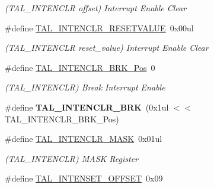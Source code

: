 \begin{DoxyCompactItemize}
\begin{DoxyCompactList}\small\item\em (T\+A\+L\+\_\+\+I\+N\+T\+E\+N\+C\+L\+R offset) Interrupt Enable Clear \end{DoxyCompactList}\item 
\hypertarget{group___s_a_m_l21___t_a_l_ga6403ffd039c93508cfb60ba10074f5d1}{}\#define \hyperlink{group___s_a_m_l21___t_a_l_ga6403ffd039c93508cfb60ba10074f5d1}{T\+A\+L\+\_\+\+I\+N\+T\+E\+N\+C\+L\+R\+\_\+\+R\+E\+S\+E\+T\+V\+A\+L\+U\+E}~0x00ul\label{group___s_a_m_l21___t_a_l_ga6403ffd039c93508cfb60ba10074f5d1}

\begin{DoxyCompactList}\small\item\em (T\+A\+L\+\_\+\+I\+N\+T\+E\+N\+C\+L\+R reset\+\_\+value) Interrupt Enable Clear \end{DoxyCompactList}\item 
\hypertarget{group___s_a_m_l21___t_a_l_ga827d2a0fb5912d1b0bbfcf8657d67a2c}{}\#define \hyperlink{group___s_a_m_l21___t_a_l_ga827d2a0fb5912d1b0bbfcf8657d67a2c}{T\+A\+L\+\_\+\+I\+N\+T\+E\+N\+C\+L\+R\+\_\+\+B\+R\+K\+\_\+\+Pos}~0\label{group___s_a_m_l21___t_a_l_ga827d2a0fb5912d1b0bbfcf8657d67a2c}

\begin{DoxyCompactList}\small\item\em (T\+A\+L\+\_\+\+I\+N\+T\+E\+N\+C\+L\+R) Break Interrupt Enable \end{DoxyCompactList}\item 
\hypertarget{group___s_a_m_l21___t_a_l_ga3c86f4eb02f554e741d3ae01a4c08dcd}{}\#define {\bfseries T\+A\+L\+\_\+\+I\+N\+T\+E\+N\+C\+L\+R\+\_\+\+B\+R\+K}~(0x1ul $<$$<$ T\+A\+L\+\_\+\+I\+N\+T\+E\+N\+C\+L\+R\+\_\+\+B\+R\+K\+\_\+\+Pos)\label{group___s_a_m_l21___t_a_l_ga3c86f4eb02f554e741d3ae01a4c08dcd}

\item 
\hypertarget{group___s_a_m_l21___t_a_l_ga39a18617cbce4fad5f851bf4e0ea9313}{}\#define \hyperlink{group___s_a_m_l21___t_a_l_ga39a18617cbce4fad5f851bf4e0ea9313}{T\+A\+L\+\_\+\+I\+N\+T\+E\+N\+C\+L\+R\+\_\+\+M\+A\+S\+K}~0x01ul\label{group___s_a_m_l21___t_a_l_ga39a18617cbce4fad5f851bf4e0ea9313}

\begin{DoxyCompactList}\small\item\em (T\+A\+L\+\_\+\+I\+N\+T\+E\+N\+C\+L\+R) M\+A\+S\+K Register \end{DoxyCompactList}\item 
\hypertarget{group___s_a_m_l21___t_a_l_gac207c8cb35569c70f258f74df898840f}{}\#define \hyperlink{group___s_a_m_l21___t_a_l_gac207c8cb35569c70f258f74df898840f}{T\+A\+L\+\_\+\+I\+N\+T\+E\+N\+S\+E\+T\+\_\+\+O\+F\+F\+S\+E\+T}~0x09\label{group___s_a_m_l21___t_a_l_gac207c8cb35569c70f258f74df898840f}


\end{DoxyCompactItemize}
